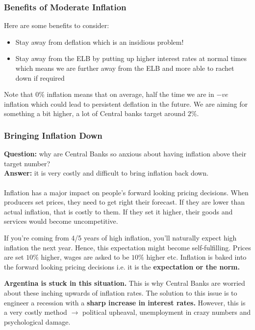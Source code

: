 \documentclass[12pt, letterpaper]{article}
\begin{document}
\subsubsection{Benefits of Moderate Inflation}
Here are some benefits to consider:
\begin{itemize}
	\item Stay away from deflation which is an insidious problem!
	\item Stay away from the ELB by putting up higher interest rates at normal times which means we are further away from the ELB and more able to rachet down if required
\end{itemize}
Note that $0\%$ inflation means that on average, half the time we are in $-ve$ inflation which could lead to persistent deflation in the future. We are aiming for something a bit higher, a lot of Central banks target around $2\%$.

\subsubsection{Bringing Inflation Down}
\textbf{Question:} why are Central Banks so anxious about having inflation above their target number?\\
\textbf{Answer:} it is very costly and difficult to bring inflation back down.\\\\
Inflation has a major impact on people's forward looking pricing decisions. When producers set prices, they need to get right their forecast. If they are lower than actual inflation, that is costly to them. If they set it higher, their goods and services would become uncompetitive.

If you're coming from 4/5 years of high inflation, you'll naturally expect high inflation the next year. Hence, this expectation might become self-fulfilling. Prices are set $10\%$ higher, wages are asked to be $10\%$ higher etc. Inflation is baked into the forward looking pricing decisions i.e. it is the \textbf{expectation or the norm.}

\textbf{Argentina is stuck in this situation.} This is why Central Banks are worried about these inching upwards of inflation rates. The solution to this issue is to engineer a recession with a \textbf{sharp increase in interest rates.} However, this is a very costly method $\rightarrow$ political upheaval, unemployment in crazy numbers and psychological damage.
\end{document}
